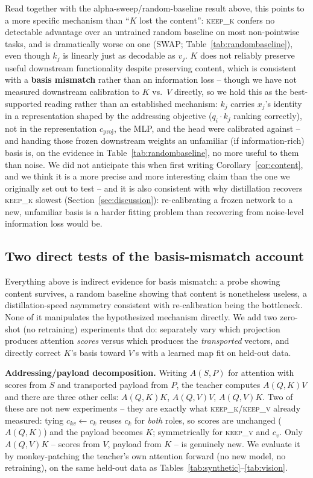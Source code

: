 \documentclass[11pt]{article}
\begin{document}
Read together with the alpha-sweep/random-baseline result above, this points to a
more specific mechanism than ``$K$ lost the content'': \textsc{keep\_k} confers no
detectable advantage over an untrained random baseline on most non-pointwise tasks,
and is dramatically worse on one (SWAP; Table~\ref{tab:randombaseline}), even though
$k_j$ is linearly just as decodable as $v_j$. $K$ does not reliably preserve useful
downstream functionality despite preserving content, which is consistent with a
\textbf{basis mismatch} rather than an information loss -- though we have not
measured downstream calibration to $K$ vs.\ $V$ directly, so we hold this as the
best-supported reading rather than an established mechanism: $k_j$ carries $x_j$'s
identity in a representation shaped by the addressing objective ($q_i \cdot k_j$
ranking correctly), not in the representation $c_{\text{proj}}$, the MLP, and the head
were calibrated against -- and handing those frozen downstream weights an unfamiliar
(if information-rich) basis is, on the evidence in Table~\ref{tab:randombaseline}, no
more useful to them than noise. We did not anticipate this when
first writing Corollary~\ref{cor:content}, and we think it is a more precise and more
interesting claim than the one we originally set out to test -- and it is also
consistent with why distillation recovers \textsc{keep\_k} slowest
(Section~\ref{sec:discussion}): re-calibrating a frozen network to a new, unfamiliar
basis is a harder fitting problem than recovering from noise-level information loss
would be.

\subsection{Two direct tests of the basis-mismatch account}
\label{sec:direct-tests}

Everything above is indirect evidence for basis mismatch: a probe showing content
survives, a random baseline showing that content is nonetheless useless, a
distillation-speed asymmetry consistent with re-calibration being the bottleneck.
None of it manipulates the hypothesized mechanism directly. We add two zero-shot
(no retraining) experiments that do: separately vary which projection produces
attention \emph{scores} versus which produces the \emph{transported} vectors, and
directly correct $K$'s basis toward $V$'s with a learned map fit on held-out data.

\textbf{Addressing/payload decomposition.} Writing $A(S, P)$ for attention with
scores from $S$ and transported payload from $P$, the teacher computes $A(Q,K)V$ and
there are three other cells: $A(Q,K)K$, $A(Q,V)V$, $A(Q,V)K$. Two of these are not
new experiments -- they are exactly what \textsc{keep\_k}/\textsc{keep\_v} already
measured: tying $c_{kv} \leftarrow c_k$ reuses $c_k$ for \emph{both} roles, so
scores are unchanged ($A(Q,K)$) and the payload becomes $K$; symmetrically for
\textsc{keep\_v} and $c_v$. Only $A(Q,V)K$ -- scores from $V$, payload from $K$ --
is genuinely new. We evaluate it by monkey-patching the teacher's own attention
forward (no new model, no retraining), on the same held-out data as
Tables~\ref{tab:synthetic}--\ref{tab:vision}.
\end{document}
